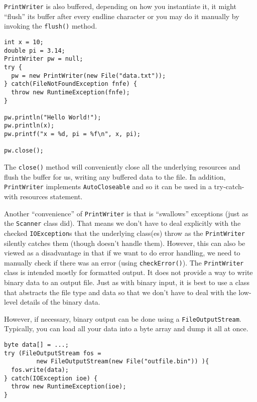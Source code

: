\texttt{PrintWriter} is also buffered, depending
on how you instantiate it, it might ``flush'' its buffer
after every endline character or you may do it manually
by invoking the \texttt{flush()} method.  

\begin{verbatim}
int x = 10;
double pi = 3.14;
PrintWriter pw = null;
try {
  pw = new PrintWriter(new File("data.txt"));
} catch(FileNotFoundException fnfe) {
  throw new RuntimeException(fnfe);
}

pw.println("Hello World!");
pw.println(x);
pw.printf("x = %d, pi = %f\n", x, pi);

pw.close();
\end{verbatim}

The \texttt{close()} method will conveniently
close all the underlying resources and flush the buffer
for us, writing any buffered data to the file. In addition, 
\texttt{PrintWriter}
implements \texttt{AutoCloseable} and so it can
be used in a try-catch-with resources statement.

Another ``convenience'' of \texttt{PrintWriter} is
that is ``swallows'' exceptions (just as the \texttt{Scanner}
class did).  That means we don't have to deal explicitly with
the checked \texttt{IOException}s that the
underlying class(es) throw as the \texttt{PrintWriter}
silently catches them (though doesn't handle them).  However, 
this can also be viewed as a disadvantage in that if we want
to do error handling, we need to manually check if there was 
an error (using \texttt{checkError()}).
The \texttt{PrintWriter} class is intended mostly
for formatted output.  It does not provide a way to write
binary data to an output file.  Just as with binary input, 
it is best to use a class that abstracts the file type and
data so that we don't have to deal with the low-level details
of the binary data.

However, if necessary, binary output can be done using a
\texttt{FileOutputStream}.  Typically, you can
load all your data into a byte array and dump it all at
once.

\begin{verbatim}
byte data[] = ...;
try (FileOutputStream fos = 
         new FileOutputStream(new File("outfile.bin")) ){
  fos.write(data);
} catch(IOException ioe) {
  throw new RuntimeException(ioe);
}
\end{verbatim}

